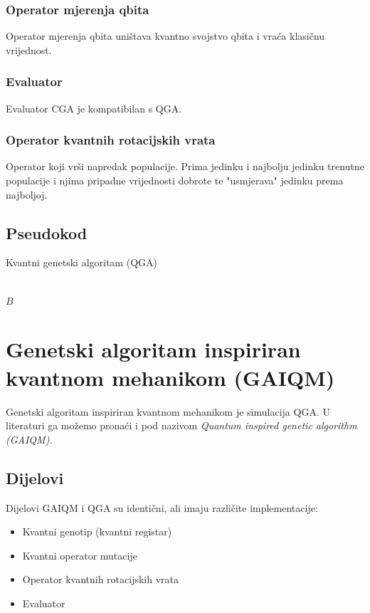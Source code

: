 \documentclass[times, utf8, zavrsni]{fer}
\begin{document}
\subsubsection{Operator mjerenja qbita}
Operator mjerenja qbita uništava kvantno svojstvo qbita i vraća klasičnu vrijednost. 

\subsubsection{Evaluator}
Evaluator CGA je kompatibilan s QGA.
\subsubsection{Operator kvantnih rotacijskih vrata}
Operator koji vrši napredak populacije. Prima jedinku i najbolju jedinku trenutne populacije i njima pripadne vrijednosti dobrote te "usmjerava" jedinku prema najboljoj.

\subsection{Pseudokod}
\begin{algorithm}
\caption{Kvantni genetski algoritam (QGA)}
\label{algo:qga}
\begin{algorithmic}
\\
\ENDWHILE
\RETURN $B$
\end{algorithmic}
\end{algorithm}

\section{Genetski algoritam inspiriran kvantnom mehanikom (GAIQM)}
Genetski algoritam inspiriran kvantnom mehanikom je simulacija QGA. U literaturi ga možemo pronaći i pod nazivom \it Quantum inspired genetic algorithm (GAIQM)\rm.

\subsection{Dijelovi}
Dijelovi GAIQM i QGA su identični, ali imaju različite implementacije:
\begin{itemize}
\item Kvantni genotip (kvantni registar)
\item Kvantni operator mutacije
\item Operator kvantnih rotacijskih vrata
\item Evaluator
\end{itemize}
\end{document}
